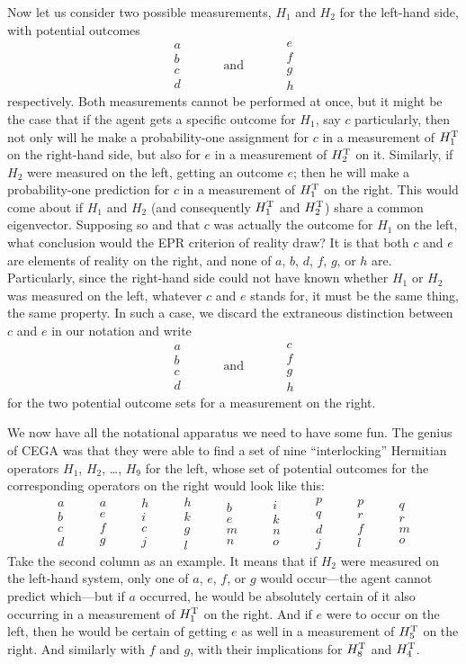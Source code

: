 \documentclass[aps,pra,superscriptaddress,10pt,tightenlines,twocolumn,nofootinbib]{revtex4}
\newcommand{\veec}[4]{%
\begin{array}{c}{\!\!#1\!\!}\\{\!\!#2\!\!}\\{\!\!#3\!\!}\\{\!\!#4\!\!}\end{array}}
\begin{document}
Now let us consider two possible measurements, $H_1$ and $H_2$ for the left-hand side, with potential outcomes
\begin{equation}
\veec abcd \quad\qquad\mbox{and}\qquad\quad \veec efgh
\end{equation}
respectively.  Both measurements cannot be performed at once, but it might be the case that if the agent gets a specific outcome for $H_1$, say $c$ particularly, then not only will he make a probability-one assignment for $c$ in a measurement of $H_1^{\rm T}$ on the right-hand side, but also for $e$ in a measurement of $H_2^{\rm T}$ on it.  Similarly, if $H_2$ were measured on the left, getting an outcome $e$; then he will make a probability-one prediction for $c$ in a measurement of $H_1^{\rm T}$ on the right.  This would come about if $H_1$ and $H_2$ (and consequently $H_1^{\rm T}$ and $H_2^{\rm T}$) share a common eigenvector.  Supposing so and that $c$ was actually the outcome for $H_1$ on the left, what conclusion would the EPR criterion of reality draw?  It is that both $c$ and $e$ are elements of reality on the right, and none of $a$, $b$, $d$, $f$, $g$, or $h$ are.  Particularly, since the right-hand side could not have known whether $H_1$ or $H_2$ was measured on the left, whatever $c$ and $e$ stands for, it must be the same thing, the same property.  In such a case, we discard the extraneous distinction between $c$ and $e$ in our notation and write
\begin{equation}
\veec abcd \quad\qquad\mbox{and}\qquad\quad \veec cfgh
\end{equation}
for the two potential outcome sets for a measurement on the right.

We now have all the notational apparatus we need to have some fun.  The genius of CEGA was that they were able to find a set of nine ``interlocking'' Hermitian operators $H_1$, $H_2$, \ldots, $H_9$ for the left, whose set of potential outcomes for the corresponding operators on the right would look like this:
\begin{equation}
\veec abcd \qquad \veec aefg \qquad \veec hicj\qquad \veec hkgl\qquad \veec bemn\qquad \veec ikno\qquad \veec pqdj\qquad \veec prfl\qquad \veec qrmo \label{BurlIves}
\end{equation}
Take the second column as an example.  It means that if $H_2$ were measured on the left-hand system, only one of $a$, $e$, $f$, or $g$ would occur---the agent cannot predict which---but if $a$ occurred, he would be absolutely certain of it also occurring in a measurement of $H_1^{\rm T}$ on the right.  And if $e$ were to occur on the left, then he would be certain of getting $e$ as well in a measurement of $H_5^{\rm T}$ on the right.  And similarly with $f$ and $g$, with their implications for $H_8^{\rm T}$ and $H_4^{\rm T}$.
\end{document}
